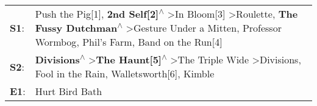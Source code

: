 \begin{supertabular}{p{0.03\textwidth}p{0.92\textwidth}}
 \textbf{S1}:  &  Push the Pig[1]\textsuperscript{}, \enspace \textbf{2nd Self[2]\textsuperscript{$\wedge$}} \textgreater \enspace In Bloom[3]\textsuperscript{} \textgreater \enspace Roulette\textsuperscript{}, \enspace \textbf{The Fussy Dutchman\textsuperscript{$\wedge$}} \textgreater \enspace Gesture Under a Mitten\textsuperscript{}, \enspace Professor Wormbog\textsuperscript{}, \enspace Phil's Farm\textsuperscript{}, \enspace Band on the Run[4]\textsuperscript{}  \enspace  \\
 \textbf{S2}:  &                                                                                                             \textbf{Divisions\textsuperscript{$\wedge$}} \textgreater \enspace \textbf{The Haunt[5]\textsuperscript{$\wedge$}} \textgreater \enspace The Triple Wide\textsuperscript{} \textgreater \enspace Divisions\textsuperscript{}, \enspace Fool in the Rain\textsuperscript{}, \enspace Walletsworth[6]\textsuperscript{}, \enspace Kimble\textsuperscript{}  \enspace  \\
 \textbf{E1}:  &                                                                                                                                                                                                                                                                                                                                                                                                                                     Hurt Bird Bath\textsuperscript{}  \enspace  \\
\end{supertabular}
